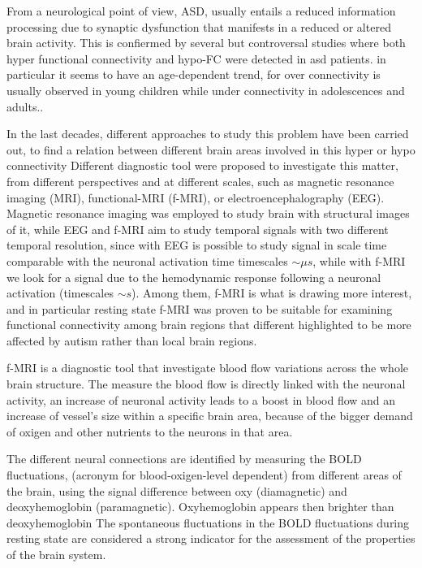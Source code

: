 \documentclass[12pt]{report}
\begin{document}
From a neurological point of view, ASD, usually entails a reduced information processing due to synaptic dysfunction that manifests in a reduced or altered brain activity. \cite{??}
This is confiermed by several but controversal studies where both hyper functional connectivity and hypo-FC were detected in asd patients.
in particular it seems to have an age-dependent trend, for over connectivity is usually observed in young children while under connectivity in adolescences and adults.\cite{supekar-2013}.

In the last decades, different approaches to study this problem have been carried out, to find a relation between different brain areas involved in this hyper or hypo connectivity
Different diagnostic tool were proposed to investigate this matter, from different perspectives and at different scales, such as magnetic resonance imaging (MRI), functional-MRI (f-MRI), or electroencephalography (EEG).
Magnetic resonance imaging was employed to study brain with structural images of it, while EEG and f-MRI aim to study temporal signals with two different temporal resolution, since with EEG is possible to study signal in scale time comparable with the neuronal activation time timescales $\sim \mu s$, while with f-MRI we look for a signal due to the hemodynamic response following a neuronal activation (timescales $\sim s$).
Among them, f-MRI is what is drawing more interest, and in particular resting state f-MRI was proven to be suitable for examining functional connectivity among brain regions that different highlighted to be more affected by autism rather than local brain regions.

f-MRI is a diagnostic tool that investigate blood flow variations across the whole brain structure.
The measure the blood flow is directly linked with the neuronal activity, an increase of neuronal activity leads to a boost in blood flow and an increase of vessel's size within a specific brain area, because of the bigger demand of oxigen and other nutrients to the neurons in that area.

The different neural connections are identified by measuring the BOLD fluctuations, (acronym for blood-oxigen-level dependent) from different areas of the brain, using the signal difference between oxy (diamagnetic) and deoxyhemoglobin (paramagnetic).
Oxyhemoglobin appears then brighter than deoxyhemoglobin
The spontaneous fluctuations in the BOLD fluctuations during resting state are considered a strong indicator for the assessment of the properties of the brain system.
\end{document}
